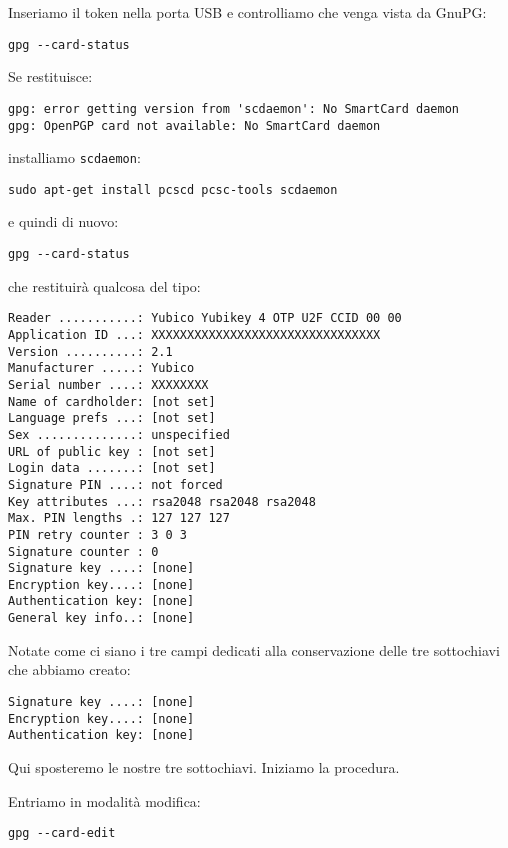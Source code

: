 \documentclass[a4paper,10pt]{article}
\begin{document}
Inseriamo il token nella porta USB e controlliamo che venga vista da GnuPG:

\begin{lstlisting}
gpg --card-status
\end{lstlisting}

Se restituisce:

\begin{lstlisting}
gpg: error getting version from 'scdaemon': No SmartCard daemon
gpg: OpenPGP card not available: No SmartCard daemon
\end{lstlisting}

installiamo \texttt{scdaemon}:

\begin{lstlisting}
sudo apt-get install pcscd pcsc-tools scdaemon
\end{lstlisting}

e quindi di nuovo:

\begin{lstlisting}
gpg --card-status
\end{lstlisting}

che restituirà qualcosa del tipo:

\begin{lstlisting}
Reader ...........: Yubico Yubikey 4 OTP U2F CCID 00 00
Application ID ...: XXXXXXXXXXXXXXXXXXXXXXXXXXXXXXXX
Version ..........: 2.1
Manufacturer .....: Yubico
Serial number ....: XXXXXXXX
Name of cardholder: [not set]
Language prefs ...: [not set]
Sex ..............: unspecified
URL of public key : [not set]
Login data .......: [not set]
Signature PIN ....: not forced
Key attributes ...: rsa2048 rsa2048 rsa2048
Max. PIN lengths .: 127 127 127
PIN retry counter : 3 0 3
Signature counter : 0
Signature key ....: [none]
Encryption key....: [none]
Authentication key: [none]
General key info..: [none]
\end{lstlisting}

Notate come ci siano i tre campi dedicati alla conservazione delle tre sottochiavi che abbiamo creato:

\begin{lstlisting}
Signature key ....: [none]
Encryption key....: [none]
Authentication key: [none]
\end{lstlisting}

Qui sposteremo le nostre tre sottochiavi. Iniziamo la procedura.

Entriamo in modalità modifica:

\begin{lstlisting}
gpg --card-edit
\end{lstlisting}
\end{document}
